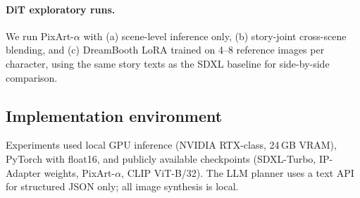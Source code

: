 \paragraph{DiT exploratory runs.}
We run PixArt-$\alpha$ with (a) scene-level inference only, (b) story-joint cross-scene blending, and (c) DreamBooth LoRA trained on 4--8 reference images per character, using the same story texts as the SDXL baseline for side-by-side comparison.

\subsection{Implementation environment}
Experiments used local GPU inference (NVIDIA RTX-class, 24\,GB VRAM), PyTorch with float16, and publicly available checkpoints (SDXL-Turbo, IP-Adapter weights, PixArt-$\alpha$, CLIP ViT-B/32).
The LLM planner uses a text API for structured JSON only; all image synthesis is local.

